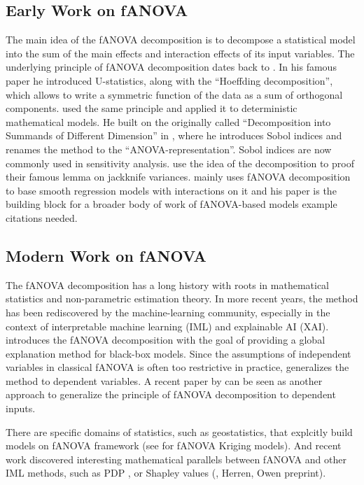 
\subsection{Early Work on fANOVA}
The main idea of the fANOVA decomposition is to decompose a statistical model into the sum of the main effects and interaction effects of its input variables. The underlying principle of fANOVA decomposition dates back to \cite{hoeffding1948}. In his famous paper he introduced U-statistics, along with the ``Hoeffding decomposition'', which allows to write a symmetric function of the data as a sum of orthogonal components. \cite{sobol1993sensitivity} used the same principle and applied it to deterministic mathematical models.
He built on the originally called ``Decomposition into Summands of Different Dimension'' in \cite{sobol2001}, where he introduces Sobol indices and renames the method to the ``ANOVA-representation''. Sobol indices are now commonly used in sensitivity analysis. \cite{efron1981} use the idea of the decomposition to proof their famous lemma on jackknife variances. \cite{stone1994} mainly uses fANOVA decomposition to base smooth regression models with interactions on it and his paper is the building block for a broader body of work of fANOVA-based models {\color{blue}example citations needed}.


\subsection{Modern Work on fANOVA}
The fANOVA decomposition has a long history with roots in mathematical statistics and non-parametric estimation theory. In more recent years, the method has been rediscovered by the machine-learning community, especially in the context of interpretable machine learning (IML) and explainable AI (XAI). \cite{hooker2004} introduces the fANOVA decomposition with the goal of providing a global explanation method for black-box models. Since the assumptions of independent variables in classical fANOVA is often too restrictive in practice, \cite{hooker2007} generalizes the method to dependent variables. A recent paper by \cite{ilidrissi2025} can be seen as another approach to generalize the principle of fANOVA decomposition to dependent inputs.\par
There are specific domains of statistics, such as geostatistics, that explcitly build models on fANOVA framework (see \cite{muehlenstaedt2012} for fANOVA Kriging models). And recent work discovered interesting mathematical parallels between fANOVA and other IML methods, such as PDP \cite{friedman2001}, or Shapley values (\cite{fumagalli2025}, Herren, Owen preprint).

